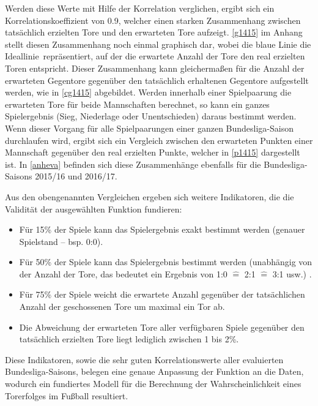 Werden diese Werte mit Hilfe der Korrelation verglichen, ergibt sich ein Korrelationskoeffizient von \textsf{0.9}, welcher einen starken Zusammenhang zwischen tatsächlich erzielten Tore und den erwarteten Tore aufzeigt. \vref{g1415} im Anhang stellt diesen Zusammenhang noch einmal graphisch dar, wobei die blaue Linie die \glqq Ideallinie\grqq~repräsentiert, auf der die erwartete Anzahl der Tore den real erzielten Toren entspricht. Dieser Zusammenhang kann gleichermaßen für die Anzahl der erwarteten Gegentore gegenüber den tatsächlich erhaltenen Gegentore aufgestellt werden, wie in \vref{cg1415} abgebildet. Werden innerhalb einer Spielpaarung die erwarteten Tore für beide Mannschaften berechnet, so kann ein ganzes Spielergebnis (Sieg, Niederlage oder Unentschieden) daraus bestimmt werden. Wenn dieser Vorgang für alle Spielpaarungen einer ganzen Bundesliga-Saison durchlaufen wird, ergibt sich ein Vergleich zwischen den erwarteten Punkten einer Mannschaft gegenüber den real erzielten Punkte, welcher in \vref{p1415} dargestellt ist. In \vref{anheva} befinden sich diese Zusammenhänge ebenfalls für die Bundesliga-Saisons 2015/16 und 2016/17.

Aus den obengenannten Vergleichen ergeben sich weitere Indikatoren, die die Validität der ausgewählten Funktion fundieren:

\begin{itemize}
\item Für \textsf{15\%} der Spiele kann das Spielergebnis exakt bestimmt werden (genauer Spielstand – bsp.  \textsf{0:0}).
\item Für  \textsf{50\%} der Spiele kann das Spielergebnis bestimmt werden (unabhängig von der Anzahl der Tore, das bedeutet ein Ergebnis von \textsf{1:0 $\hat{=}$ 2:1 $\hat{=}$ 3:1} usw.) .
\item Für \textsf{75\%} der Spiele weicht die erwartete Anzahl gegenüber der tatsächlichen Anzahl der geschossenen Tore um maximal ein Tor ab.
\item Die Abweichung der erwarteten Tore aller verfügbaren Spiele gegenüber den tatsächlich erzielten Tore liegt lediglich zwischen \textsf{1} bis \textsf{2\%}.
\end{itemize}

Diese Indikatoren, sowie die sehr guten Korrelationswerte aller evaluierten Bundesliga-Saisons, belegen eine genaue Anpassung der Funktion an die Daten, wodurch ein fundiertes Modell für die Berechnung der Wahrscheinlichkeit eines Torerfolges im Fußball resultiert.